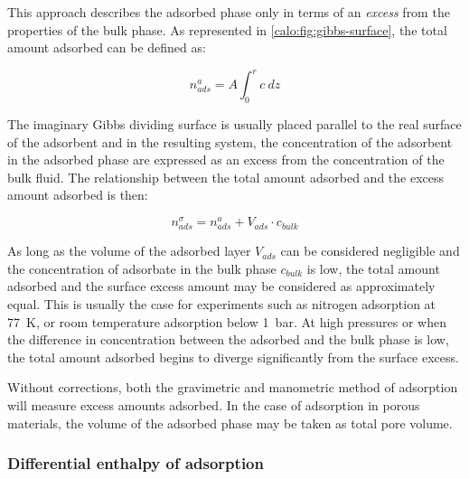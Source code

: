 This approach describes the adsorbed phase only in terms
of an \textit{excess} from the properties of the bulk phase.
As represented in \autoref{calo:fig:gibbs-surface}, the total
amount adsorbed can be defined as:

\begin{equation}
	n_{ads}^{a} = A \int_0^r c\ dz
\end{equation}

The imaginary Gibbs dividing surface is usually placed parallel to
the real surface of the adsorbent and in the resulting system, the
concentration of the adsorbent in the adsorbed phase are
expressed as an excess from the concentration of the bulk fluid.
The relationship between the total amount adsorbed and the
excess amount adsorbed is then:

\begin{equation}
	n_{ads}^{\sigma} = n_{ads}^{a} + V_{ads} \cdot c_{bulk}
\end{equation}

As long as the volume of the adsorbed layer \(V_{ads}\) can be
considered negligible and the concentration of adsorbate in the bulk
phase \(c_{bulk}\) is low, the total amount adsorbed and the surface
excess amount may be considered as approximately equal.
This is usually the case for experiments such as nitrogen
adsorption at \SI{77}{\kelvin}, or room temperature adsorption
below \SI{1}{\bar}.
At high pressures or when the difference in concentration between
the adsorbed and the bulk phase is low, the total amount adsorbed
begins to diverge significantly from the surface excess.

Without corrections, both the gravimetric and manometric
method of adsorption will measure excess amounts adsorbed.
In the case of adsorption in porous materials, the volume of the
adsorbed phase may be taken as total pore volume.

\subsubsection{Differential enthalpy of adsorption}

